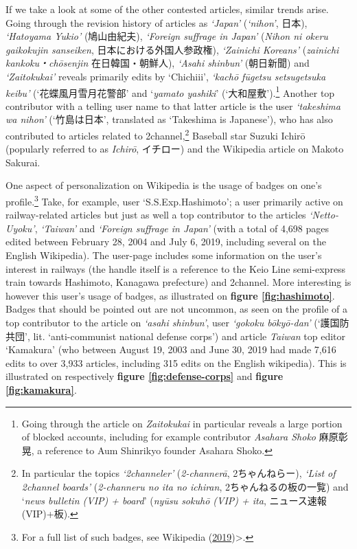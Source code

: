 \documentclass[10pt,british,A4paper,twoside]{memoir}
\begin{document}
If we take a look at some of the other contested articles, similar
trends arise. Going through the revision history of articles as
\emph{`Japan'} (\emph{`nihon'}, 日本), \emph{`Hatoyama Yukio'}
(鳩山由紀夫), \emph{`Foreign suffrage in Japan'} (\emph{Nihon ni okeru
gaikokujin sanseiken}, 日本における外国人参政権), \emph{`Zainichi
Koreans'} (\emph{zainichi kankoku・chōsenjin} 在日韓国・朝鮮人),
\emph{`Asahi shinbun'} (朝日新聞) and \emph{`Zaitokukai'} reveals
primarily edits by `Chichiii', \emph{`kachō fūgetsu setsugetsuka keibu'}
(`花蝶風月雪月花警部' and `\emph{yamato yashiki}'
(`大和屋敷').\footnote{Going through the article on \emph{Zaitokukai} in
  particular reveals a large portion of blocked accounts, including for
  example contributor \emph{Asahara Shoko} 麻原彰晃, a reference to Aum
  Shinrikyo founder Asahara Shoko.} Another top contributor with a
telling user name to that latter article is the user \emph{`takeshima wa
nihon'} (`竹島は日本', translated as `Takeshima is Japanese'), who has
also contributed to articles related to 2channel,\footnote{In particular
  the topics \emph{`2channeler'} (\emph{2-channerā}, 2ちゃんねらー),
  \emph{`List of 2channel boards'} (\emph{2-channeru no ita no ichiran},
  2ちゃんねるの板の一覧) and `\emph{news bulletin (VIP) + board}'
  (\emph{nyūsu sokuhō (VIP) + ita}, ニュース速報(VIP)+板).} Baseball
star Suzuki Ichirō (popularly referred to as \emph{Ichirō}, イチロー)
and the Wikipedia article on Makoto Sakurai.

One aspect of personalization on Wikipedia is the usage of badges on
one's profile.\footnote{For a full list of such badges, see Wikipedia
  (\protect\hyperlink{ref-anonymous_wikipedia:_2019}{2019})\textgreater{}.}
Take, for example, user `S.S.Exp.Hashimoto'; a user primarily active on
railway-related articles but just as well a top contributor to the
articles \emph{`Netto-Uyoku'}, \emph{`Taiwan'} and \emph{`Foreign
suffrage in Japan'} (with a total of 4,698 pages edited between February
28, 2004 and July 6, 2019, including several on the English Wikipedia).
The user-page includes some information on the user's interest in
railways (the handle itself is a reference to the Keio Line semi-express
train towards Hashimoto, Kanagawa prefecture) and 2channel. More
interesting is however this user's usage of badges, as illustrated on
\textbf{figure \ref{fig:hashimoto}}. Badges that should be pointed out
are not uncommon, as seen on the profile of a top contributor to the
article on \emph{`asahi shinbun'}, user \emph{`gokoku bōkyō-dan'}
(`護国防共団', lit. `anti-communist national defense corps') and article
\emph{Taiwan} top editor `Kamakura' (who between August 19, 2003 and
June 30, 2019 had made 7,616 edits to over 3,933 articles, including 315
edits on the English wikipedia). This is illustrated on respectively
\textbf{figure \ref{fig:defense-corps}} and \textbf{figure
\ref{fig:kamakura}}.
\end{document}
